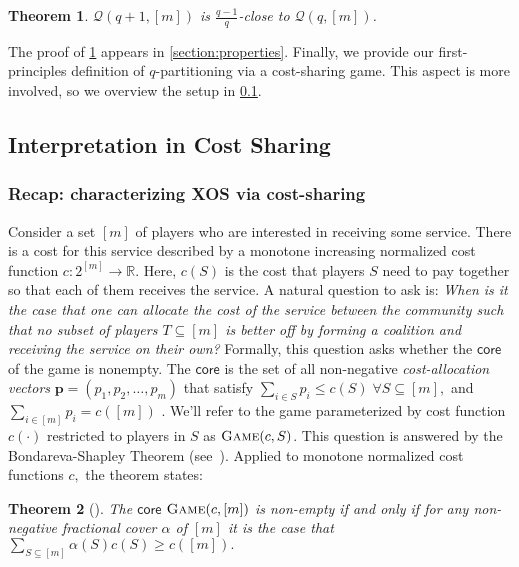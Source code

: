 \documentclass[11pt]{article}\usepackage{amsfonts}
\newtheorem{theorem}{Theorem}
\numberwithin{theorem}{subsection}
\newcommand{\game}{\textsc{Game}}
\newcommand{\core}{{\mathsf{core}}}
\begin{document}
\begin{theorem}
\label{thm:smoothness}
$\mathcal{Q}(q+1,[m])$ is  $\frac{q-1}{q}$-close to $\mathcal{Q}(q,[m])$.
 \end{theorem}

 The proof of \cref{thm:smoothness} appears in \cref{section:properties}. Finally, we provide our first-principles definition of $q$-partitioning via a cost-sharing game. This aspect is more involved, so we overview the setup in \cref{section:costsharing}.

\subsection{Interpretation in Cost Sharing}
\label{section:costsharing}

\subsubsection{Recap: characterizing XOS via cost-sharing}
Consider a set $[m]$ of players who are interested in receiving some service. There is a 
cost for this service described by a monotone increasing normalized cost function $c: 2^{[m]}\longrightarrow \mathbb{R}.$ Here, $c(S)$ is the cost that players $S$ need to pay together so that each of them receives the service. A natural question to ask is: \textit{When is it the case that one can allocate the cost of the service between the community such that no subset of players $T\subseteq [m]$ is better off by forming a coalition and receiving the service on their own?} Formally, this question asks whether the $\core$ of the game is nonempty. The $\core$ is the set of all non-negative \textit{cost-allocation vectors} $\mathbf{p} = (p_1, p_2, \ldots, p_m)$ that satisfy $\sum_{i\in S}p_i \le c(S) \; \forall S\subseteq [m],$ and $\sum_{i\in [m]}p_i = c([m])$ \cite[Definition 15.3]{AGTbook}. We'll refer to the game parameterized by cost function $c(\cdot)$ restricted to players in $S$ as $\game(c,S)$.
This question is answered by the Bondareva-Shapley Theorem (see~\cite[Theorem 15.6]{AGTbook}). Applied to monotone normalized cost functions $c,$ the theorem states:

\begin{theorem}[\cite{Bondareva63,Shapley67}]
\label{thm:classicshapleycorethm}
The $\core$ $\game(c,[m])$ is non-empty if and only if for any non-negative fractional cover $\alpha$ of $[m]$ it is the case that $\sum_{S\subseteq[m]}\alpha(S)c(S) \ge c([m]).$
\end{theorem}
\end{document}
